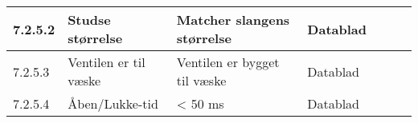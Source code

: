 \begin{center}
\begin{longtable}{ | m{1.785cm} | m{1.785cm}| m{1.785cm}| m{1.785cm}| m{1.785cm}| m{1.785cm}|m{1.785cm}| }
			7.2.5.2 
			& 
Studse størrelse
   & 
Matcher slangens størrelse
    &
     Datablad
    &  & & \\
			\hline
		
				7.2.5.3
			& 
Ventilen er til væske
   & 
Ventilen er bygget til væske
    &
     Datablad
    &  & & \\
			\hline	
			
						7.2.5.4
			& 
Åben/Lukke-tid
   & 
< 50 ms
    &
     Datablad
    &  & & \\
			\hline	
			
\end{longtable}
		
	\end{center}
	\pagebreak